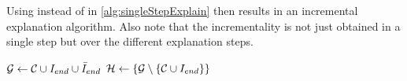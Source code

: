 Using \omusinc instead of \omus in \cref{alg:singleStepExplain}  then results in an incremental explanation algorithm. Also note that the incrementality is not just obtained in a single step but over the different explanation steps. 
% 
% 
% 
% 

% 
%  
% 
% 
%  
% 
% 
% 
%  
% 
% 
%  
% 
%  
% 
%  
% 
% 
% 
%  
% 
% 



\begin{algorithm}[ht]
$\mathcal{G}  \gets \mathcal{C}  \cup I_{end} \cup \bar{I}_{end}$\;
$\mathcal{H}  \gets \{\mathcal{G}  \setminus \{\mathcal{C}  \cup I_{end}\}\}$\;
\end{algorithm}
